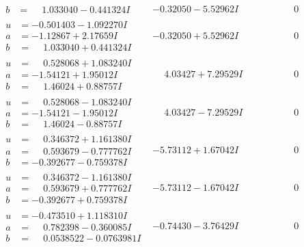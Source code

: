 \documentclass[1p]{elsarticle_modified}
\theoremstyle{definition}
\begin{document}
$$\begin{array}{c|c|c}
\begin{aligned}
b &= \phantom{-}1.033040 - 0.441324 I\end{aligned}
 & -0.32050 - 5.52962 I & \phantom{-0.000000 } 0 \\ \hline\begin{aligned}
u &= -0.501403 - 1.092270 I \\
a &= -1.12867 + 2.17659 I \\
b &= \phantom{-}1.033040 + 0.441324 I\end{aligned}
 & -0.32050 + 5.52962 I & \phantom{-0.000000 } 0 \\ \hline\begin{aligned}
u &= \phantom{-}0.528068 + 1.083240 I \\
a &= -1.54121 + 1.95012 I \\
b &= \phantom{-}1.46024 + 0.88757 I\end{aligned}
 & \phantom{-}4.03427 + 7.29529 I & \phantom{-0.000000 } 0 \\ \hline\begin{aligned}
u &= \phantom{-}0.528068 - 1.083240 I \\
a &= -1.54121 - 1.95012 I \\
b &= \phantom{-}1.46024 - 0.88757 I\end{aligned}
 & \phantom{-}4.03427 - 7.29529 I & \phantom{-0.000000 } 0 \\ \hline\begin{aligned}
u &= \phantom{-}0.346372 + 1.161380 I \\
a &= \phantom{-}0.593679 - 0.777762 I \\
b &= -0.392677 - 0.759378 I\end{aligned}
 & -5.73112 + 1.67042 I & \phantom{-0.000000 } 0 \\ \hline\begin{aligned}
u &= \phantom{-}0.346372 - 1.161380 I \\
a &= \phantom{-}0.593679 + 0.777762 I \\
b &= -0.392677 + 0.759378 I\end{aligned}
 & -5.73112 - 1.67042 I & \phantom{-0.000000 } 0 \\ \hline\begin{aligned}
u &= -0.473510 + 1.118310 I \\
a &= \phantom{-}0.782398 - 0.360085 I \\
b &= \phantom{-}0.0538522 - 0.0763981 I\end{aligned}
 & -0.74430 - 3.76429 I & \phantom{-0.000000 } 0 \\ \hline\begin{aligned}

\end{aligned}
\end{array}$$
\end{document}
